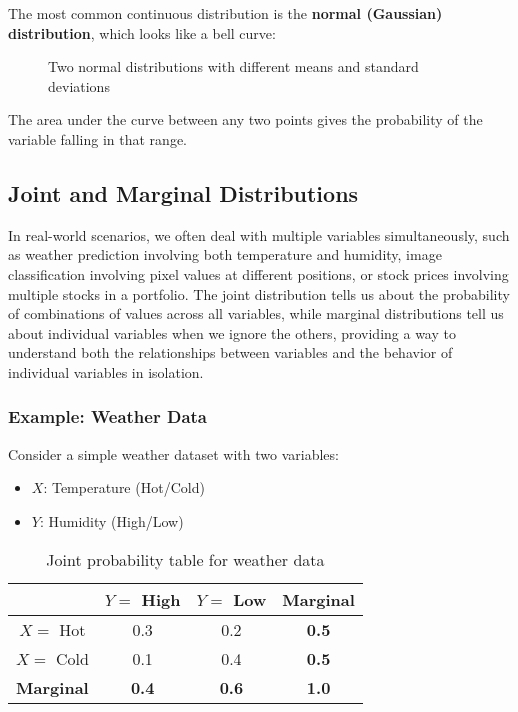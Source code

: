 The most common continuous distribution is the \textbf{normal (Gaussian) distribution}, which looks like a bell curve:

\begin{figure}[h]
\centering
{}
\caption{Two normal distributions with different means and standard deviations}
\label{fig:normal-distributions}
\end{figure}

The area under the curve between any two points gives the probability of the variable falling in that range.

\subsection{Joint and Marginal Distributions}

In real-world scenarios, we often deal with multiple variables simultaneously, such as weather prediction involving both temperature and humidity, image classification involving pixel values at different positions, or stock prices involving multiple stocks in a portfolio. The joint distribution tells us about the probability of combinations of values across all variables, while marginal distributions tell us about individual variables when we ignore the others, providing a way to understand both the relationships between variables and the behavior of individual variables in isolation.

\subsubsection{Example: Weather Data}

Consider a simple weather dataset with two variables:
\begin{itemize}
    \item $X$: Temperature (Hot/Cold)
    \item $Y$: Humidity (High/Low)
\end{itemize}

\begin{table}[h]
\centering
\begin{tabular}{|c|c|c|c|}
\hline
 & $Y=$ High & $Y=$ Low & \textbf{Marginal} \\
\hline
$X=$ Hot & 0.3 & 0.2 & \textbf{0.5} \\
$X=$ Cold & 0.1 & 0.4 & \textbf{0.5} \\
\hline
\textbf{Marginal} & \textbf{0.4} & \textbf{0.6} & \textbf{1.0} \\
\hline
\end{tabular}
\caption{Joint probability table for weather data}
\label{tab:weather-joint}
\end{table}

